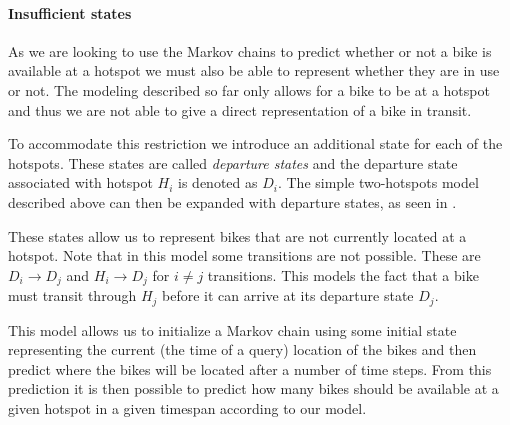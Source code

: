 \paragraph{Insufficient states}
As we are looking to use the Markov chains to predict whether or not a bike is available at a hotspot we must also be able to represent whether they are in use or not.
The modeling described so far only allows for a bike to be at a hotspot and thus we are not able to give a direct representation of a bike in transit.

To accommodate this restriction we introduce an additional state for each of the hotspots.
These states are called \emph{departure states} and the departure state associated with hotspot $H_i$ is denoted as $D_i$.
The simple two-hotspots model described above can then be expanded with departure states, as seen in .



These states allow us to represent bikes that are not currently located at a hotspot.
Note that in this model some transitions are not possible.
These are $D_i \rightarrow D_j$ and $H_i \rightarrow D_j $ for $i \neq j$ transitions.
This models the fact that a bike must transit through $H_j$ before it can arrive at its departure state $D_j$.

This model allows us to initialize a Markov chain using some initial state representing the current (the time of a query) location of the bikes and then predict where the bikes will be located after a number of time steps.
From this prediction it is then possible to predict how many bikes should be available at a given hotspot in a given timespan according to our model.
